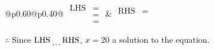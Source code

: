 \documentclass[12pt]{article}
\begin{document}
\begin{multicols}{2}
\begin{minipage}[t]{0.40\textwidth}
    \noindent
    \renewcommand{\arraystretch}{1.3} %
    \begin{tabular}{@{}p{0.60\linewidth}@{}p{0.40\linewidth}@{}}
        \(\begin{aligned}
            \text{LHS} &=  \\
                    &=  \\
                    &= 
        \end{aligned}\) &
        \(\begin{aligned}
            \text{RHS} &= \\
                    & \\
                    &
        \end{aligned}\)
    \end{tabular}
    \renewcommand{\arraystretch}{1.0} %
    \vspace{2pt}  %

    \noindent \(\therefore\) Since \(\text{LHS} \dotuline{\hspace{5mm}} \text{RHS}\), \(x = 20\) \dotuline{\hspace{12mm}} a solution to the equation.

\end{minipage}

\vspace*{0.5ex}
\vfill{}
\newpage
    
\end{multicols}
\end{document}
